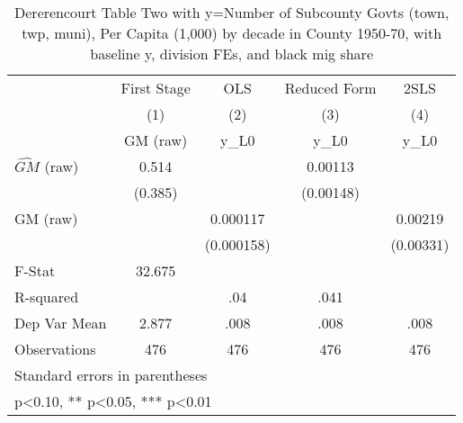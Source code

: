 \begin{table}[htbp]\centering
\def\sym#1{\ifmmode^{#1}\else\(^{#1}\)\fi}
\caption{Dererencourt Table Two with y=Number of Subcounty Govts (town, twp, muni), Per Capita (1,000) by decade in County 1950-70, with baseline y, division FEs, and black mig share}
\begin{tabular}{l*{4}{c}}
\toprule
                    & First Stage   &         OLS   &Reduced Form   &        2SLS   \\
                    &\multicolumn{1}{c}{(1)}&\multicolumn{1}{c}{(2)}&\multicolumn{1}{c}{(3)}&\multicolumn{1}{c}{(4)}\\
                    &\multicolumn{1}{c}{GM  (raw)}&\multicolumn{1}{c}{y\_L0}&\multicolumn{1}{c}{y\_L0}&\multicolumn{1}{c}{y\_L0}\\
\midrule
$\hat{GM}$ (raw)    &       0.514   &               &     0.00113   &               \\
                    &     (0.385)   &               &   (0.00148)   &               \\
\addlinespace
GM  (raw)           &               &    0.000117   &               &     0.00219   \\
                    &               &  (0.000158)   &               &   (0.00331)   \\
\midrule
F-Stat              &      32.675   &               &               &               \\
R-squared           &               &         .04   &        .041   &               \\
Dep Var Mean        &       2.877   &        .008   &        .008   &        .008   \\
Observations        &         476   &         476   &         476   &         476   \\
\bottomrule
\multicolumn{5}{l}{\footnotesize Standard errors in parentheses}\\
\multicolumn{5}{l}{\footnotesize * p<0.10, ** p<0.05, *** p<0.01}\\
\end{tabular}
\end{table}
